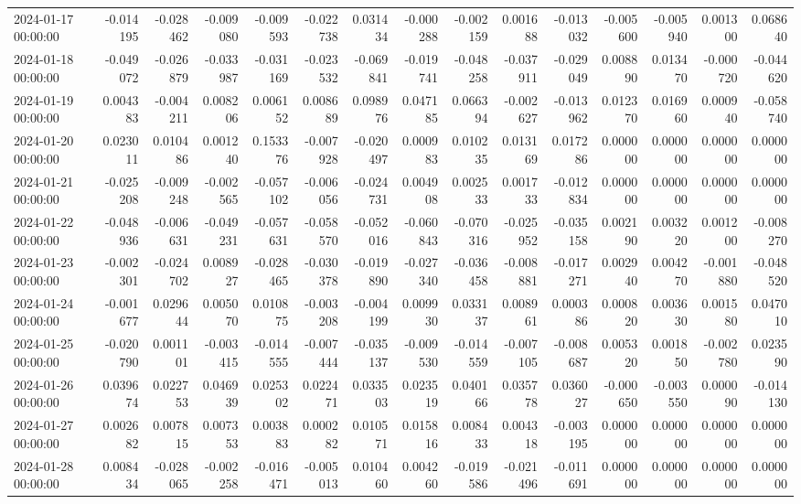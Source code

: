 \begin{tabular}{lrrrrrrrrrrrrrr}
2024-01-17 00:00:00 & -0.014195 & -0.028462 & -0.009080 & -0.009593 & -0.022738 & 0.031434 & -0.000288 & -0.002159 & 0.001688 & -0.013032 & -0.005600 & -0.005940 & 0.001300 & 0.068640 \\
2024-01-18 00:00:00 & -0.049072 & -0.026879 & -0.033987 & -0.031169 & -0.023532 & -0.069841 & -0.019741 & -0.048258 & -0.037911 & -0.029049 & 0.008890 & 0.013470 & -0.000720 & -0.044620 \\
2024-01-19 00:00:00 & 0.004383 & -0.004211 & 0.008206 & 0.006152 & 0.008689 & 0.098976 & 0.047185 & 0.066394 & -0.002627 & -0.013962 & 0.012370 & 0.016960 & 0.000940 & -0.058740 \\
2024-01-20 00:00:00 & 0.023011 & 0.010486 & 0.001240 & 0.153376 & -0.007928 & -0.020497 & 0.000983 & 0.010235 & 0.013169 & 0.017286 & 0.000000 & 0.000000 & 0.000000 & 0.000000 \\
2024-01-21 00:00:00 & -0.025208 & -0.009248 & -0.002565 & -0.057102 & -0.006056 & -0.024731 & 0.004908 & 0.002533 & 0.001733 & -0.012834 & 0.000000 & 0.000000 & 0.000000 & 0.000000 \\
2024-01-22 00:00:00 & -0.048936 & -0.006631 & -0.049231 & -0.057631 & -0.058570 & -0.052016 & -0.060843 & -0.070316 & -0.025952 & -0.035158 & 0.002190 & 0.003220 & 0.001200 & -0.008270 \\
2024-01-23 00:00:00 & -0.002301 & -0.024702 & 0.008927 & -0.028465 & -0.030378 & -0.019890 & -0.027340 & -0.036458 & -0.008881 & -0.017271 & 0.002940 & 0.004270 & -0.001880 & -0.048520 \\
2024-01-24 00:00:00 & -0.001677 & 0.029644 & 0.005070 & 0.010875 & -0.003208 & -0.004199 & 0.009930 & 0.033137 & 0.008961 & 0.000386 & 0.000820 & 0.003630 & 0.001580 & 0.047010 \\
2024-01-25 00:00:00 & -0.020790 & 0.001101 & -0.003415 & -0.014555 & -0.007444 & -0.035137 & -0.009530 & -0.014559 & -0.007105 & -0.008687 & 0.005320 & 0.001850 & -0.002780 & 0.023590 \\
2024-01-26 00:00:00 & 0.039674 & 0.022753 & 0.046939 & 0.025302 & 0.022471 & 0.033503 & 0.023519 & 0.040166 & 0.035778 & 0.036027 & -0.000650 & -0.003550 & 0.000090 & -0.014130 \\
2024-01-27 00:00:00 & 0.002682 & 0.007815 & 0.007353 & 0.003883 & 0.000282 & 0.010571 & 0.015816 & 0.008433 & 0.004318 & -0.003195 & 0.000000 & 0.000000 & 0.000000 & 0.000000 \\
2024-01-28 00:00:00 & 0.008434 & -0.028065 & -0.002258 & -0.016471 & -0.005013 & 0.010460 & 0.004260 & -0.019586 & -0.021496 & -0.011691 & 0.000000 & 0.000000 & 0.000000 & 0.000000 \\

\end{tabular}
